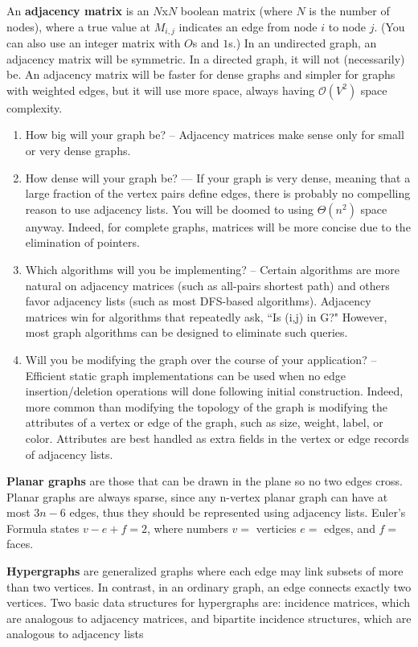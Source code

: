 \documentclass{article}
\newcommand{\bigO}{\mathcal{O}}
\begin{document}
    An \textbf{adjacency matrix} is an $N$x$N$ boolean matrix (where $N$ is the number of nodes), where a true value at $M_{i,j}$ indicates an edge from node $i$ to node $j$. (You can also use an integer matrix with $O$s and $1$s.) In an undirected graph, an adjacency matrix will be symmetric. In a directed graph, it will not (necessarily) be. An adjacency matrix will be faster for dense graphs and simpler for graphs with weighted edges, but it will use more space, always having $\bigO(V^2)$ space complexity.
    
    \begin{enumerate}
        \item How big will your graph be? – Adjacency matrices make sense only for small or very dense graphs.
        \item How dense will your graph be? –– If your graph is very dense, meaning that a large fraction of the vertex pairs define edges, there is probably no compelling reason to use adjacency lists. You will be doomed to using $\Theta(n^2)$ space anyway. Indeed, for complete graphs, matrices will be more concise due to the elimination of pointers.
        \item Which algorithms will you be implementing? – Certain algorithms are more natural on adjacency matrices (such as all-pairs shortest path) and others favor adjacency lists (such as most DFS-based algorithms). Adjacency matrices win for algorithms that repeatedly ask, ``Is (i,j) in G?" However, most graph algorithms can be designed to eliminate such queries.
        \item Will you be modifying the graph over the course of your application? – Efficient static graph implementations can be used when no edge insertion/deletion operations will done following initial construction. Indeed, more common than modifying the topology of the graph is modifying the attributes of a vertex or edge of the graph, such as size, weight, label, or color. Attributes are best handled as extra fields in the vertex or edge records of adjacency lists.
    \end{enumerate}
    
    \textbf{Planar graphs} are those that can be drawn in the plane so no two edges cross. Planar graphs are always sparse, since any n-vertex planar graph can have at most $3n - 6$ edges, thus they should be represented using adjacency lists. Euler's Formula states $v-e+f=2$, where numbers $v = $ verticies $e = $ edges, and $f = $ faces.
    
    \textbf{Hypergraphs} are generalized graphs where each edge may link subsets of more than two vertices. In contrast, in an ordinary graph, an edge connects exactly two vertices. Two basic data structures for hypergraphs are: incidence matrices, which are analogous to adjacency matrices, and bipartite incidence structures, which are analogous to adjacency lists
    
\end{document}
